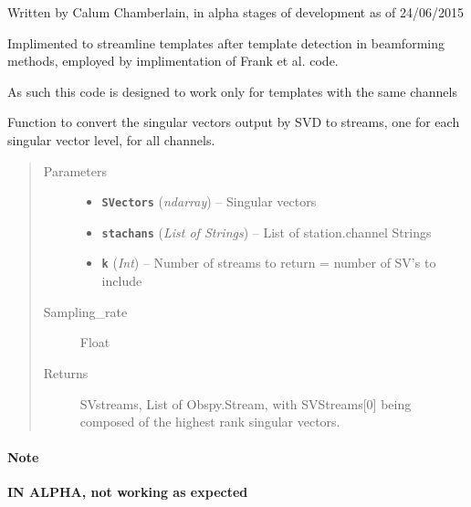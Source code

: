 \documentclass[a4paper,10pt,english]{sphinxmanual}
\begin{document}
Written by Calum Chamberlain, in alpha stages of development as of 24/06/2015

Implimented to streamline templates after template detection in beamforming
methods, employed by implimentation of Frank et al. code.

As such this code is designed to work only for templates with the same channels

\begin{fulllineitems}
\label{modules:clustering.SVD_2_stream_testing}
Function to convert the singular vectors output by SVD to streams, one for
each singular vector level, for all channels.
\begin{quote}\begin{description}
\item[{Parameters}] \leavevmode\begin{itemize}
\item {} 
\textbf{\texttt{SVectors}} (\emph{ndarray}) -- Singular vectors

\item {} 
\textbf{\texttt{stachans}} (\emph{List of Strings}) -- List of station.channel Strings

\item {} 
\textbf{\texttt{k}} (\emph{Int}) -- Number of streams to return = number of SV's to include

\end{itemize}

\item[{Sampling\_rate}] \leavevmode
Float

\item[{Returns}] \leavevmode
SVstreams, List of Obspy.Stream, with SVStreams{[}0{]} being
composed of the highest rank singular vectors.

\end{description}\end{quote}
\paragraph{Note}

\textbf{IN ALPHA, not working as expected}

\end{fulllineitems}

\end{document}

